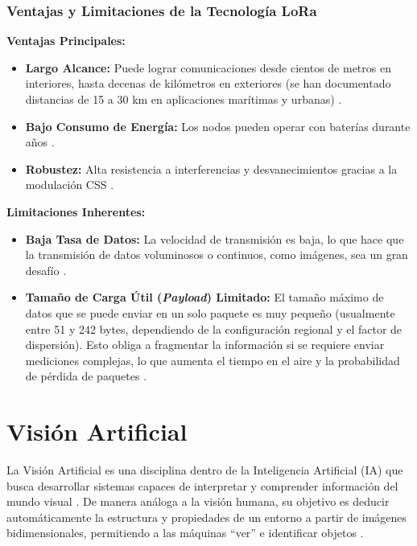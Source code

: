 \subsubsection{Ventajas y Limitaciones de la Tecnología LoRa}
\textbf{Ventajas Principales:}
\begin{itemize}
    \item \textbf{Largo Alcance:} Puede lograr comunicaciones desde cientos de metros en interiores, hasta decenas de kilómetros en exteriores (se han documentado distancias de 15 a 30 km en aplicaciones marítimas y urbanas) \cite{jebril2018_overcoming, staikopoulos2020_survey}.
    \item \textbf{Bajo Consumo de Energía:} Los nodos pueden operar con baterías durante años \cite{bor2016_lora}.
    \item \textbf{Robustez:} Alta resistencia a interferencias y desvanecimientos gracias a la modulación CSS \cite{devalal2018_overview}.
\end{itemize}

\textbf{Limitaciones Inherentes:}
\begin{itemize}
    \item \textbf{Baja Tasa de Datos:} La velocidad de transmisión es baja, lo que hace que la transmisión de datos voluminosos o continuos, como imágenes, sea un gran desafío \cite{jebril2018_overcoming, tonghao2019_efficient}.
    \item \textbf{Tamaño de Carga Útil (\textit{Payload}) Limitado:} El tamaño máximo de datos que se puede enviar en un solo paquete es muy pequeño (usualmente entre 51 y 242 bytes, dependiendo de la configuración regional y el factor de dispersión). Esto obliga a fragmentar la información si se requiere enviar mediciones complejas, lo que aumenta el tiempo en el aire y la probabilidad de pérdida de paquetes \cite{semtech_sx1261}.
\end{itemize}


\section{Visión Artificial}
\label{sec:vision_artificial}

La Visión Artificial es una disciplina dentro de la Inteligencia Artificial (IA) que busca desarrollar sistemas capaces de interpretar y comprender información del mundo visual \cite{szeliski2022computer}. De manera análoga a la visión humana, su objetivo es deducir automáticamente la estructura y propiedades de un entorno a partir de imágenes bidimensionales, permitiendo a las máquinas ``ver'' e identificar objetos \cite{visionartificialunirioja}.

